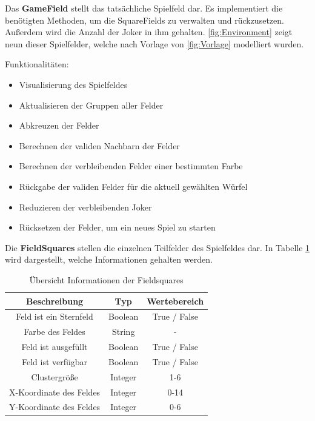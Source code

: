 Das \textbf{GameField} stellt das tatsächliche Spielfeld dar.
Es implementiert die benötigten Methoden, um die SquareFields zu verwalten und rückzusetzen.
Außerdem wird die Anzahl der Joker in ihm gehalten. \ref{fig:Environment} zeigt neun dieser Spielfelder, welche nach Vorlage von \ref{fig:Vorlage} modelliert wurden.

Funktionalitäten:
\begin{itemize}
	\item  Visualisierung des Spielfeldes
    \item  Aktualisieren der Gruppen aller Felder
    \item  Abkreuzen der Felder
    \item  Berechnen der validen Nachbarn der Felder
    \item  Berechnen der verbleibenden Felder einer bestimmten Farbe
    \item  Rückgabe der validen Felder für die aktuell gewählten Würfel
    \item  Reduzieren der verbleibenden Joker
    \item  Rücksetzen der Felder, um ein neues Spiel zu starten
\end{itemize}

Die \textbf{FieldSquares} stellen die einzelnen Teilfelder des Spielfeldes dar. In Tabelle \ref{tab:Informationen in FieldSquares} wird dargestellt, welche Informationen gehalten werden.
\begin{table}[htbp]
    \centering
    \begin{tabular}{|c|c|c|}
    \hline
    \textbf{Beschreibung} & \textbf{Typ} & \textbf{Wertebereich} \\
    \hline
    Feld ist ein Sternfeld & Boolean & True / False \\
    \hline
    Farbe des Feldes & String & - \\
    \hline
    Feld ist ausgefüllt & Boolean & True / False \\
    \hline
    Feld ist verfügbar & Boolean & True / False \\
    \hline
    Clustergröße & Integer & 1-6 \\
    \hline
    X-Koordinate des Feldes & Integer & 0-14 \\
    \hline
    Y-Koordinate des Feldes & Integer & 0-6 \\
    \hline
    \end{tabular}
    \caption{Übersicht Informationen der Fieldsquares}
    \label{tab:Informationen in FieldSquares}
\end{table}

